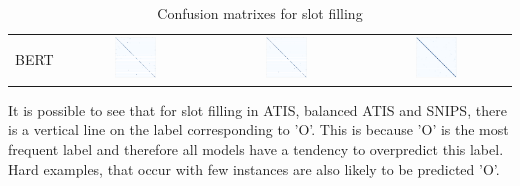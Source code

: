 \documentclass[a4paper]{article}
\begin{document}
\begin{table}[h!]
\begin{adjustbox}{max width=\textwidth}
\begin{tabular}{l|ccc}
			BERT &  \includegraphics[width=0.3\textwidth]{"../assets/images/confusion matrixes/CM_BERT_slot_ATIS_labeless"} & \includegraphics[width=0.3\textwidth]{"../assets/images/confusion matrixes/CM_BERT_slot_remix_ATIS_labeless"} &\includegraphics[width=0.3\textwidth]{"../assets/images/confusion matrixes/CM_BERT_slot_SNIPS_labeless"} \\
		\end{tabular}
	\end{adjustbox}

\caption{Confusion matrixes for slot filling}
\label{fig:cm_slot}
\end{table}

It is possible to see that for slot filling in ATIS, balanced ATIS and SNIPS, there is a vertical line on the label corresponding to 'O'. This is because 'O' is the most frequent label and therefore all models have a tendency to overpredict this label. Hard examples, that occur with few instances are also likely to be predicted 'O'. 
\end{document}
